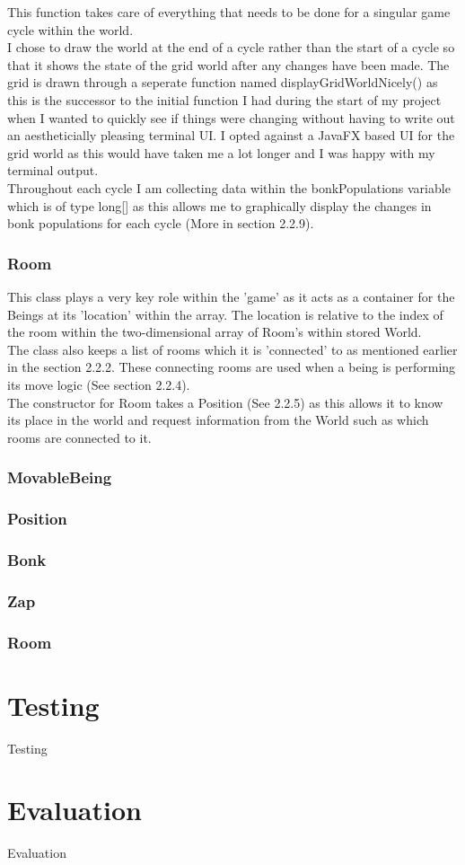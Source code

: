 \documentclass[12pt]{article}
\begin{document}
This function takes care of everything that needs to be done for a singular game cycle within the world. \\

I chose to draw the world at the end of a cycle rather than the start of a cycle so that it shows the state of the grid world after any changes have been made. The grid is drawn through a seperate function named displayGridWorldNicely() as this is the successor to the initial function I had during the start of my project when I wanted to quickly see if things were changing without having to write out an aestheticially pleasing terminal UI. I opted against a JavaFX based UI for the grid world as this would have taken me a lot longer and I was happy with my terminal output.\\

Throughout each cycle I am collecting data within the bonkPopulations variable which is of type long[] as this allows me to graphically display the changes in bonk populations for each cycle (More in section 2.2.9).

\subsubsection{Room}
This class plays a very key role within the 'game' as it acts as a container for the Beings at its 'location' within the array. The location is relative to the index of the room within the two-dimensional array of Room's within stored World.\\

The class also keeps a list of rooms which it is 'connected' to as mentioned earlier in the section 2.2.2. These connecting rooms are used when a being is performing its move logic (See section 2.2.4).\\

The constructor for Room takes a Position (See 2.2.5) as this allows it to know its place in the world and request information from the World such as which rooms are connected to it.


\subsubsection{MovableBeing}
\subsubsection{Position}
\subsubsection{Bonk}
\subsubsection{Zap}
\subsubsection{Room}

\section{Testing}
Testing
\section{Evaluation}
Evaluation
 
\end{document}
